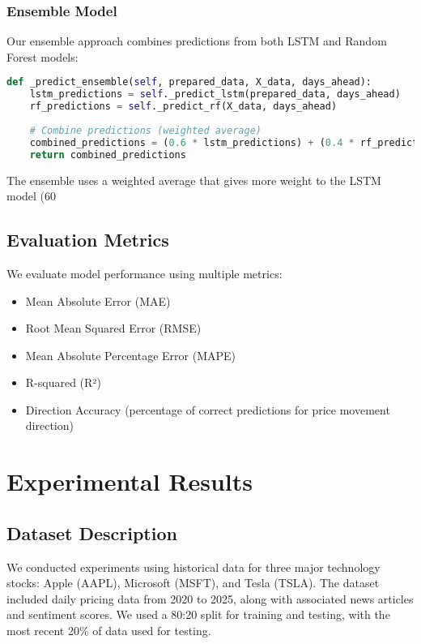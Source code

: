 \documentclass[review]{elsarticle}
\begin{document}
\subsubsection{Ensemble Model}

Our ensemble approach combines predictions from both LSTM and Random Forest models:

\begin{lstlisting}[language=Python, caption=Ensemble Model Prediction]
def _predict_ensemble(self, prepared_data, X_data, days_ahead):
    lstm_predictions = self._predict_lstm(prepared_data, days_ahead)
    rf_predictions = self._predict_rf(X_data, days_ahead)
    
    # Combine predictions (weighted average)
    combined_predictions = (0.6 * lstm_predictions) + (0.4 * rf_predictions)
    return combined_predictions
\end{lstlisting}

The ensemble uses a weighted average that gives more weight to the LSTM model (60%

\subsection{Evaluation Metrics}

We evaluate model performance using multiple metrics:

\begin{itemize}
    \item Mean Absolute Error (MAE)
    \item Root Mean Squared Error (RMSE)
    \item Mean Absolute Percentage Error (MAPE)
    \item R-squared (R²)
    \item Direction Accuracy (percentage of correct predictions for price movement direction)
\end{itemize}

\section{Experimental Results}
\label{results}

\subsection{Dataset Description}

We conducted experiments using historical data for three major technology stocks: Apple (AAPL), Microsoft (MSFT), and Tesla (TSLA). The dataset included daily pricing data from 2020 to 2025, along with associated news articles and sentiment scores. We used a 80:20 split for training and testing, with the most recent 20\% of data used for testing.
\end{document}
